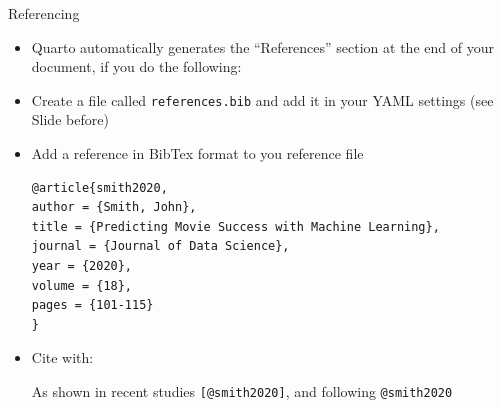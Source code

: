 \documentclass[
  10pt,
  ignorenonframetext,
]{beamer}
\begin{document}
\begin{frame}[fragile]{Referencing}
\label{referencing}
\small

\begin{itemize}
\item
  Quarto automatically generates the ``References'' section at the end
  of your document, if you do the following:
\item
  Create a file called \texttt{references.bib} and add it in your YAML
  settings (see Slide before)
\item
  Add a reference in BibTex format to you reference file

  \scriptsize

\begin{verbatim}
@article{smith2020,
author = {Smith, John},
title = {Predicting Movie Success with Machine Learning},
journal = {Journal of Data Science},
year = {2020},
volume = {18},
pages = {101-115}
}
\end{verbatim}

  \small
\item
  Cite with:

  \footnotesize As shown in recent studies \texttt{{[}@smith2020{]}},
  and following \texttt{@smith2020}
\end{itemize}
\end{frame}
\end{document}

